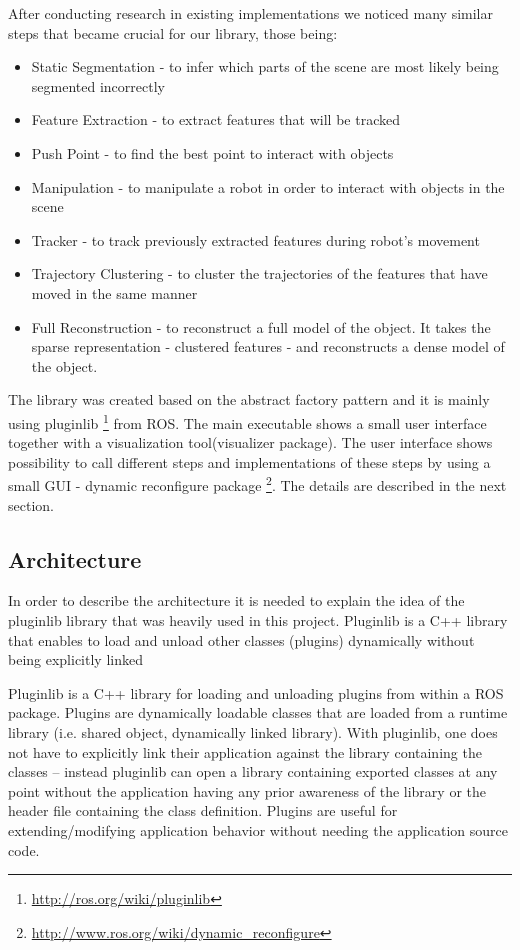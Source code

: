 After conducting research in existing implementations we noticed many similar steps that became crucial for our library, those being:

\begin{itemize}
\item Static Segmentation - to infer which parts of the scene are most likely being segmented incorrectly
\item Feature Extraction - to extract features that will be tracked
\item Push Point - to find the best point to interact with objects
\item Manipulation - to manipulate a robot in order to interact with objects in the scene
\item Tracker - to track previously extracted features during robot's movement
\item Trajectory Clustering - to cluster the trajectories of the features that have moved in the same manner
\item Full Reconstruction - to reconstruct a full model of the object. It takes the sparse representation - clustered features - and reconstructs a dense model of the object.
\end{itemize}




The library was created based on the abstract factory pattern and it is mainly using pluginlib \footnote{\url{http://ros.org/wiki/pluginlib}} from ROS. The main executable  shows a small user interface together with a visualization tool(visualizer package). The user interface shows possibility to call different steps and implementations of these steps by using a small GUI - dynamic reconfigure package \footnote{\url{http://www.ros.org/wiki/dynamic_reconfigure}}. The details are described in the next section.

\subsection{Architecture}

In order to describe the architecture it is needed to explain the idea of the pluginlib library that was heavily used in this project. Pluginlib is a C++ library that enables to load and unload other classes (plugins) dynamically without being explicitly linked   

Pluginlib is a C++ library for loading and unloading plugins from within a ROS package. Plugins are dynamically loadable classes that are loaded from a runtime library (i.e. shared object, dynamically linked library). With pluginlib, one does not have to explicitly link their application against the library containing the classes -- instead pluginlib can open a library containing exported classes at any point without the application having any prior awareness of the library or the header file containing the class definition. Plugins are useful for extending/modifying application behavior without needing the application source code. 

